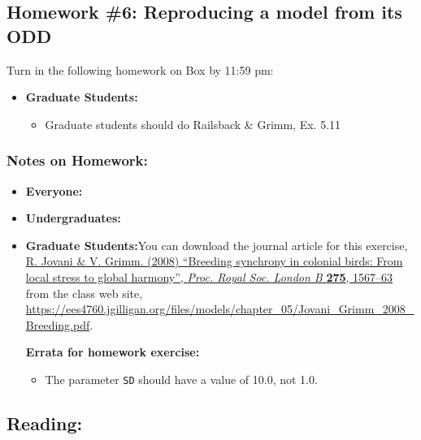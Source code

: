 \documentclass[]{article}
\providecommand{\tightlist}{%
  \setlength{\itemsep}{0pt}\setlength{\parskip}{0pt}}
\begin{document}
\hypertarget{homework-6-reproducing-a-model-from-its-odd}{%
\subsection{Homework \#6: Reproducing a model from its
ODD}\label{homework-6-reproducing-a-model-from-its-odd}}

Turn in the following homework on Box by 11:59 pm:

\begin{itemize}
\tightlist
\item
  \textbf{Graduate Students:}

  \begin{itemize}
  \tightlist
  \item
    Graduate students should do Railsback \& Grimm, Ex. 5.11
  \end{itemize}
\end{itemize}

\hypertarget{notes-on-homework-2}{%
\subsubsection{Notes on Homework:}\label{notes-on-homework-2}}

\begin{itemize}
\item
  \textbf{Everyone:}
\item
  \textbf{Undergraduates:}
\item
  \textbf{Graduate Students:}You can download the journal article for
  this exercise,
  \href{/files/models/chapter_05/Jovani_Grimm_2008_Breeding.pdf}{R.
  Jovani \& V. Grimm. (2008) ``Breeding synchrony in colonial birds:
  From local stress to global harmony'', \emph{Proc. Royal Soc. London
  B} \textbf{275}, 1567--63} from the class web site,
  \url{https://ees4760.jgilligan.org/files/models/chapter_05/Jovani_Grimm_2008_Breeding.pdf}.

  \textbf{Errata for homework exercise:}

  \begin{itemize}
  \tightlist
  \item
    The parameter \texttt{SD} should have a value of 10.0, not 1.0.
  \end{itemize}
\end{itemize}

\hypertarget{reading-7}{%
\subsection{Reading:}\label{reading-7}}
\end{document}
